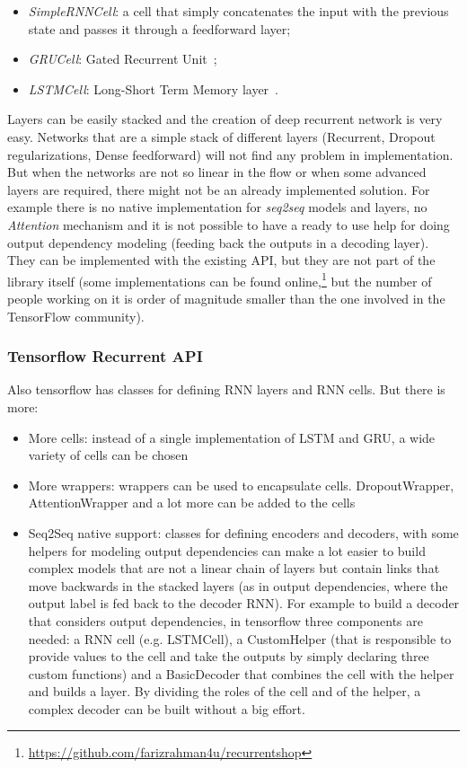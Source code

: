 \begin{itemize}
	\item \textit{SimpleRNNCell}: a cell that simply concatenates the input with the previous state and passes it through a feedforward layer;

	\item \textit{GRUCell}: Gated Recurrent Unit~\cite{cho2014learning};

	\item \textit{LSTMCell}: Long-Short Term Memory layer~\cite{hochreiter1997long}.
\end{itemize}

Layers can be easily stacked and the creation of deep recurrent network is very easy. Networks that are a simple stack of different layers (Recurrent, Dropout regularizations, Dense feedforward) will not find any problem in implementation. But when the networks are not so linear in the flow or when some advanced layers are required, there might not be an already implemented solution. For example there is no native implementation for \textit{seq2seq} models and layers, no \textit{Attention} mechanism and it is not possible to have a ready to use help for doing output dependency modeling (feeding back the outputs in a decoding layer). They can be implemented with the existing API, but they are not part of the library itself (some implementations can be found online,\footnote{\url{https://github.com/farizrahman4u/recurrentshop}} but the number of people working on it is order of magnitude smaller than the one involved in the TensorFlow community).

\subsubsection{Tensorflow Recurrent API}
Also tensorflow has classes for defining RNN layers and RNN cells. But there is more:

\begin{itemize}
	\item More cells: instead of a single implementation of LSTM and GRU, a wide variety of cells can be chosen

	\item More wrappers: wrappers can be used to encapsulate cells. DropoutWrapper, AttentionWrapper and a lot more can be added to the cells

	\item Seq2Seq native support: classes for defining encoders and decoders, with some helpers for modeling output dependencies can make a lot easier to build complex models that are not a linear chain of layers but contain links that move backwards in the stacked layers (as in output dependencies, where the output label is fed back to the decoder RNN). For example to build a decoder that considers output dependencies, in tensorflow three components are needed: a RNN cell (e.g. LSTMCell), a CustomHelper (that is responsible to provide values to the cell and take the outputs by simply declaring three custom functions) and a BasicDecoder that combines the cell with the helper and builds a layer. By dividing the roles of the cell and of the helper, a complex decoder can be built without a big effort.
\end{itemize}

